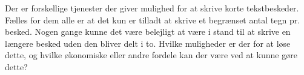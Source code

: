 Der er forskellige tjenester der giver mulighed for at skrive korte tekstbeskeder. Fælles for dem alle er at det kun er tilladt at skrive et begrænset antal tegn pr. besked. Nogen gange kunne det være belejligt at være i stand til at skrive en længere besked uden den bliver delt i to. Hvilke muligheder er der for at løse dette, og hvilke økonomiske eller andre fordele kan der være ved at kunne gøre dette?